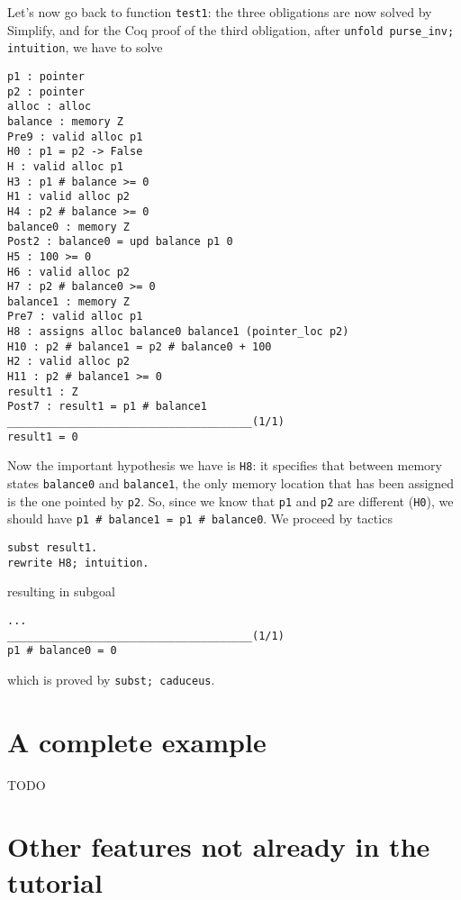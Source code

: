 \documentclass[12pt,a4paper,twoside,openright]{report}
\begin{document}
Let's now go back to function \verb|test1|: the three obligations are
now solved by Simplify, and for the Coq proof of the third obligation,
after \verb|unfold purse_inv; intuition|, we have to solve
\begin{verbatim}
p1 : pointer
p2 : pointer
alloc : alloc
balance : memory Z
Pre9 : valid alloc p1
H0 : p1 = p2 -> False
H : valid alloc p1
H3 : p1 # balance >= 0
H1 : valid alloc p2
H4 : p2 # balance >= 0
balance0 : memory Z
Post2 : balance0 = upd balance p1 0
H5 : 100 >= 0
H6 : valid alloc p2
H7 : p2 # balance0 >= 0
balance1 : memory Z
Pre7 : valid alloc p1
H8 : assigns alloc balance0 balance1 (pointer_loc p2)
H10 : p2 # balance1 = p2 # balance0 + 100
H2 : valid alloc p2
H11 : p2 # balance1 >= 0
result1 : Z
Post7 : result1 = p1 # balance1
______________________________________(1/1)
result1 = 0
\end{verbatim}
Now the important hypothesis we have is \verb|H8|: it specifies that
between memory states \verb|balance0| and \verb|balance1|, the only
memory location that has been assigned is the one pointed by
\verb|p2|. So, since we know that \verb|p1| and \verb|p2| are different
(\verb|H0|), we should have \verb|p1 # balance1 = p1 # balance0|. We proceed
by tactics
\begin{verbatim}
subst result1.
rewrite H8; intuition.
\end{verbatim}
resulting in subgoal
\begin{verbatim}
...
______________________________________(1/1)
p1 # balance0 = 0
\end{verbatim}
which is proved by \verb|subst; caduceus|.















\section{A complete example}

TODO







\section{Other features not already in the tutorial}
\end{document}
